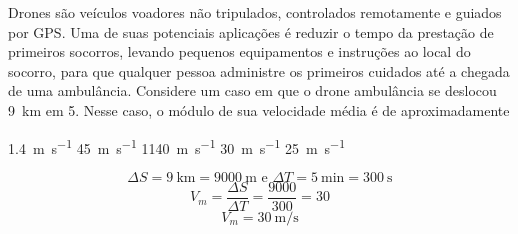 \question [20] Drones são veículos voadores não tripulados, controlados remotamente e guiados por GPS. Uma de suas potenciais aplicações é reduzir o tempo da prestação de primeiros socorros, levando pequenos equipamentos e instruções ao local do socorro, para que qualquer pessoa administre os primeiros cuidados até a chegada de uma ambulância. Considere um caso em que o drone ambulância se deslocou \SI{9}{\kilo\meter} em \SI{5}{\min}. Nesse caso, o módulo de sua velocidade média é de aproximadamente   


		\begin{EnvUplevel}
			\begin{choices}
			
			\choice \SI[per-mode=fraction]{1,4}{\meter\per\second}  
			\choice \SI[per-mode=fraction]{45}{\meter\per\second}   
			\choice \SI[per-mode=fraction]{1140}{\meter\per\second}       
			\correctchoice \SI[per-mode=fraction]{30}{\meter\per\second}      
			\choice \SI[per-mode=fraction]{25}{\meter\per\second} 
				
			\end{choices}
		\end{EnvUplevel}
		
		\begin{EnvUplevel}
		\begin{solution}
		$$
		\Delta S=\SI{9}{\kilo\meter}=\SI{9000}{\meter} \text{ e } \Delta T=\SI{5}{\minute}=\SI{300}{\second}
		$$
		$$
		V_m=\frac{\Delta S}{\Delta T}=\frac{9000}{300}=30
		$$$$
		V_m=\SI[per-mode=fraction]{30}{\meter\per\second}
		$$
		\end{solution}
		\end{EnvUplevel}


	
